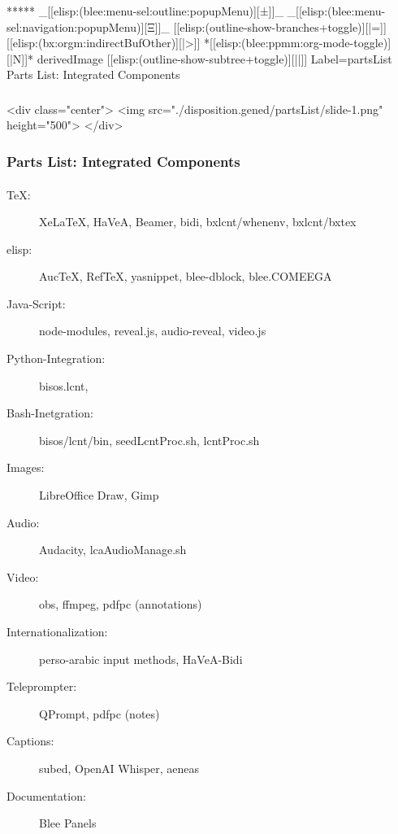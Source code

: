 \begin{whenOrg}
\begin{whenOrg}
*****  _[[elisp:(blee:menu-sel:outline:popupMenu)][±]]_ _[[elisp:(blee:menu-sel:navigation:popupMenu)][Ξ]]_ [[elisp:(outline-show-branches+toggle)][|=]] [[elisp:(bx:orgm:indirectBufOther)][|>]] *[[elisp:(blee:ppmm:org-mode-toggle)][|N]]*  derivedImage [[elisp:(outline-show-subtree+toggle)][||]] Label=partsList Parts List: Integrated Components
\end{whenOrg}

\begin{htmlonly}

\begin{frame}[fragile,plain,label=partsList]
    \frametitle{}
    \framesubtitle{}
    \begin{rawhtml}
<div class="center">
<img src="./disposition.gened/partsList/slide-1.png" height="500">
</div>
    \end{rawhtml}
\end{frame}
\end{htmlonly}

\begin{verblatex}

\begin{frame}[fragile,plain,label=partsList]
    \frametitle{Parts List: Integrated Components}
    \framesubtitle{}

\begin{description}
\item[TeX:] XeLaTeX, HaVeA, Beamer, bidi, {\color{violet}bxlcnt/whenenv}, {\color{violet}bxlcnt/bxtex}
\item[elisp:] AucTeX, RefTeX, yasnippet, {\color{violet}blee-dblock}, {\color{violet}blee.COMEEGA}
\item[Java-Script:] node-modules, reveal.js, audio-reveal, video.js
\item[Python-Integration:] {\color{violet}bisos.lcnt},
\item[Bash-Inetgration:] {\color{violet}bisos/lcnt/bin}, {\color{violet}seedLcntProc.sh}, {\color{violet}lcntProc.sh}
\item[Images:] LibreOffice Draw, Gimp
\item[Audio:] Audacity, {\color{violet}lcaAudioManage.sh}
\item[Video:] obs, ffmpeg, pdfpc (annotations)
\item [Internationalization:]  {\color{violet}perso-arabic input methods}, {\color{violet}HaVeA-Bidi}
\item[Teleprompter:] QPrompt, pdfpc (notes)
\item[Captions:] subed, OpenAI Whisper, aeneas
\item[Documentation:] {\color{violet}Blee Panels}
\end{description}


\end{frame}
\end{verblatex}
\end{whenOrg}
